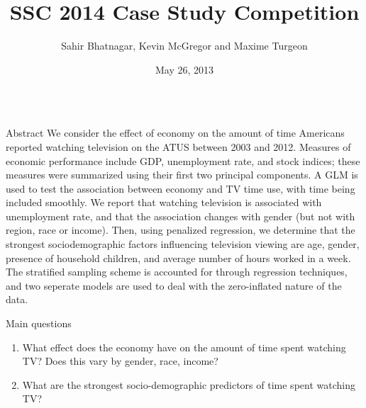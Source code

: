 \documentclass[final]{beamer}
\title{SSC 2014 Case Study Competition}
\author{Sahir Bhatnagar, Kevin McGregor and Maxime Turgeon}
\institute{Department of Epidemiology, Biostatistics and Occupational Health, McGill University}
\date{May 26, 2013}
\newcounter{acolumn}%
\def\autoheight{\vspace*{0pt}}%
\begin{document}
  \begin{frame} 
    \vfill
    
        \begin{acolumns}[t]
          
          
          
          \begin{column}{.24\linewidth}
          
          
            \begin{block}{Abstract}
    			We consider the effect of economy on the amount of time Americans reported watching television on the ATUS  between 2003 and 2012. Measures of economic performance include GDP, unemployment rate, and stock indices; these measures were summarized using their first two principal components. A GLM is used to test the association between economy and TV time use, with time being included smoothly. We report that watching television is associated with unemployment rate, and that the association changes with gender (but not with region, race or income). Then, using penalized regression, we determine that the strongest sociodemographic factors influencing television viewing are age, gender, presence of household children, and average number of hours worked in a week.  The stratified sampling scheme is accounted for through regression techniques, and two seperate models are used to deal with the zero-inflated nature of the data. 
            
            \end{block}
            
            \begin{block}{Main questions}
                        
                        \begin{enumerate}
                        	\item What effect does the economy have on the amount of time spent watching TV? Does this vary by gender, race, income? 
            
                        	\item What are the strongest socio-demographic predictors of time spent watching TV?
                        \end{enumerate}
                        \autoheight
                       \end{block}
            
          
          \end{column}
          

\end{acolumns}
\end{frame}
\end{document}
